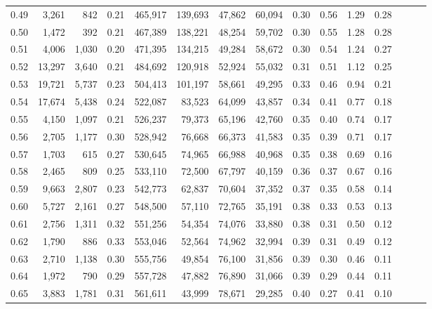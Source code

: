 \begin{tabular}{rrrrrrrrrrrrrrr}
0.49 &   3,261 &    842 &  0.21 &  465,917 &  139,693 &   47,862 &   60,094 &  0.30 &  0.56 &  1.29 &      0.28 \\
0.50 &   1,472 &    392 &  0.21 &  467,389 &  138,221 &   48,254 &   59,702 &  0.30 &  0.55 &  1.28 &      0.28 \\
0.51 &   4,006 &  1,030 &  0.20 &  471,395 &  134,215 &   49,284 &   58,672 &  0.30 &  0.54 &  1.24 &      0.27 \\
0.52 &  13,297 &  3,640 &  0.21 &  484,692 &  120,918 &   52,924 &   55,032 &  0.31 &  0.51 &  1.12 &      0.25 \\
0.53 &  19,721 &  5,737 &  0.23 &  504,413 &  101,197 &   58,661 &   49,295 &  0.33 &  0.46 &  0.94 &      0.21 \\
0.54 &  17,674 &  5,438 &  0.24 &  522,087 &   83,523 &   64,099 &   43,857 &  0.34 &  0.41 &  0.77 &      0.18 \\
0.55 &   4,150 &  1,097 &  0.21 &  526,237 &   79,373 &   65,196 &   42,760 &  0.35 &  0.40 &  0.74 &      0.17 \\
0.56 &   2,705 &  1,177 &  0.30 &  528,942 &   76,668 &   66,373 &   41,583 &  0.35 &  0.39 &  0.71 &      0.17 \\
0.57 &   1,703 &    615 &  0.27 &  530,645 &   74,965 &   66,988 &   40,968 &  0.35 &  0.38 &  0.69 &      0.16 \\
0.58 &   2,465 &    809 &  0.25 &  533,110 &   72,500 &   67,797 &   40,159 &  0.36 &  0.37 &  0.67 &      0.16 \\
0.59 &   9,663 &  2,807 &  0.23 &  542,773 &   62,837 &   70,604 &   37,352 &  0.37 &  0.35 &  0.58 &      0.14 \\
0.60 &   5,727 &  2,161 &  0.27 &  548,500 &   57,110 &   72,765 &   35,191 &  0.38 &  0.33 &  0.53 &      0.13 \\
0.61 &   2,756 &  1,311 &  0.32 &  551,256 &   54,354 &   74,076 &   33,880 &  0.38 &  0.31 &  0.50 &      0.12 \\
0.62 &   1,790 &    886 &  0.33 &  553,046 &   52,564 &   74,962 &   32,994 &  0.39 &  0.31 &  0.49 &      0.12 \\
0.63 &   2,710 &  1,138 &  0.30 &  555,756 &   49,854 &   76,100 &   31,856 &  0.39 &  0.30 &  0.46 &      0.11 \\
0.64 &   1,972 &    790 &  0.29 &  557,728 &   47,882 &   76,890 &   31,066 &  0.39 &  0.29 &  0.44 &      0.11 \\
0.65 &   3,883 &  1,781 &  0.31 &  561,611 &   43,999 &   78,671 &   29,285 &  0.40 &  0.27 &  0.41 &      0.10 \\

\end{tabular}
